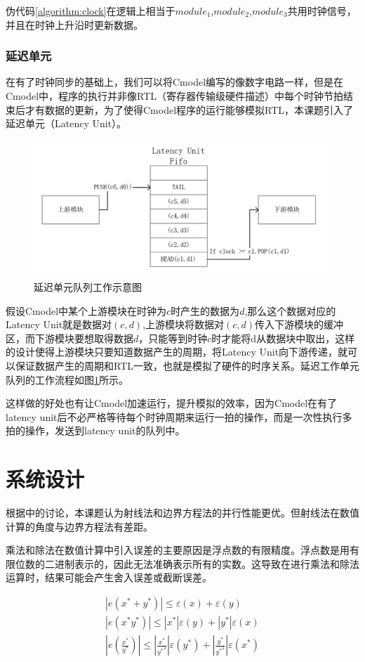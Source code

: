 伪代码\ref{algorithm:clock}在逻辑上相当于$module_1$,$module_2$,$module_3$共用时钟信号，并且在时钟上升沿时更新数据。

\subsubsection{延迟单元}

在有了时钟同步的基础上，我们可以将Cmodel编写的像数字电路一样，但是在Cmodel中，程序的执行并非像RTL（寄存器传输级硬件描述）中每个时钟节拍结束后才有数据的更新，为了使得Cmodel程序的运行能够模拟RTL，本课题引入了延迟单元（Latency Unit）。
\begin{figure}[h]
    \centering
    \includegraphics[width=.5\textwidth]{figure/latencyunitfifo.png}
    \caption{\label{fig:latency unit fifo}延迟单元队列工作示意图}
\end{figure}
假设Cmodel中某个上游模块在时钟为$c$时产生的数据为$d$,那么这个数据对应的Latency Unit就是数据对$(c,d)$,上游模块将数据对$(c,d)$传入下游模块的缓冲区，而下游模块要想取得数据$d$，只能等到时钟$c$时才能将d从数据块中取出，这样的设计使得上游模块只要知道数据产生的周期，将Latency Unit向下游传递，就可以保证数据产生的周期和RTL一致，也就是模拟了硬件的时序关系。延迟工作单元队列的工作流程如图\ref{fig:latency unit fifo}所示。

这样做的好处也有让Cmodel加速运行，提升模拟的效率，因为Cmodel在有了latency unit后不必严格等待每个时钟周期来运行一拍的操作，而是一次性执行多拍的操作，发送到latency unit的队列中。






\section{系统设计}

根据中的讨论，本课题认为射线法和边界方程法的并行性能更优。但射线法在数值计算的角度与边界方程法有差距。

乘法和除法在数值计算中引入误差的主要原因是浮点数的有限精度。浮点数是用有限位数的二进制表示的，因此无法准确表示所有的实数。这导致在进行乘法和除法运算时，结果可能会产生舍入误差或截断误差。

\begin{equation}
    \label{eq:numerical error}
    \begin{split}
        |e(x^*+y^*)|  \leq \varepsilon (x) +  \varepsilon (y) \\ 
        |e(x^*y^*)|  \leq |x^*|\varepsilon (y) +  |y^*| \varepsilon (x) \\ 
        |e(\frac{x^*}{y^*})| \leq |\frac{x^*}{{y^*}^2}|\varepsilon(y^*) + |\frac{y^*}{{y^*}^2}|\varepsilon(x^*)
    \end{split}
\end{equation}

